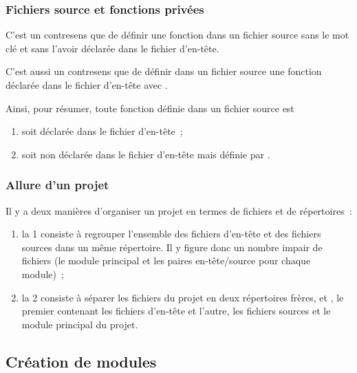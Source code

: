 \begin{frame}[fragile]
\frametitle{Fichiers source et fonctions privées}
C'est un contresens que de définir une fonction dans un fichier source
sans le mot clé  et sans l'avoir déclarée dans le fichier
d'en-tête.
\bigskip

C'est aussi un contresens que de définir dans un fichier source une
fonction déclarée dans le fichier d'en-tête avec .
\bigskip

Ainsi, pour résumer, toute fonction définie dans un fichier source est
\begin{enumerate}
    \item soit déclarée dans le fichier d'en-tête~;
    \item soit non déclarée dans le fichier d'en-tête mais définie
    par .
\end{enumerate}
\end{frame}

\begin{frame}[fragile]
\frametitle{Allure d'un projet}
Il y a deux manières d'organiser un projet en termes de fichiers et de
répertoires~:
\medskip

\begin{enumerate}
    \item la 1\iere{} consiste à regrouper l'ensemble des fichiers
    d'en-tête et des fichiers sources dans un même répertoire. Il y figure
    donc un nombre impair de fichiers (le module principal et les
    paires en-tête/source pour chaque module)~;
    \bigskip

    \item la 2\ieme{} consiste à séparer les fichiers du projet
    en deux répertoires frères,  et , le
    premier contenant les fichiers d'en-tête et l'autre, les fichiers
    sources et le module principal du projet.
\end{enumerate}

\end{frame}

\subsection{Création de modules}

